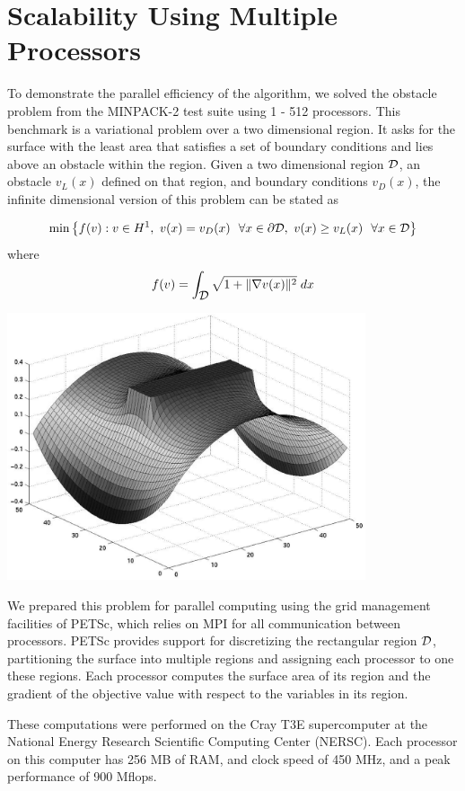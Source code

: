 \section{Scalability Using Multiple Processors}

To demonstrate the parallel efficiency of the algorithm,
we solved the obstacle problem from the MINPACK-2 test
suite using 1 - 512 processors.  
This benchmark is a variational problem over a two
dimensional region.  
It asks for the surface with the least area that satisfies a 
set of boundary conditions and lies above an obstacle within
the region. 
Given a two dimensional region ${\mbox{$\cal D$}}$, an obstacle $v_L(x)$ defined on
that region, and boundary conditions $v_D (x)$,
the infinite dimensional version of this problem can be stated as

\[
\min \left \{ f(v) :
v \in H^1, \ v(x) = v_D (x) \ \ \forall  x \in \partial \cD, \ 
                v(x) \ge v_L (x) \ \ \forall  x \in \cD
\right \}
\]
where 
\[
f(v) = \int_{\mbox{$\cal D$}} \sqrt{ 1 + \| \nabla v(x) \|^2 } \; dx
\]

\centerline {\includegraphics[height=3.1in]{surf5.ps}}

We prepared this problem for parallel computing 
using the grid management facilities of PETSc, 
which relies on MPI \cite{using-mpi} for all
communication between processors.
PETSc provides support for
discretizing the rectangular region ${\mbox{$\cal D$}}$,
partitioning the surface into multiple regions and assigning
each processor to one these regions.  Each processor computes the surface
area of its region and the gradient of the objective value with respect to
the variables in its region.

These computations were performed on the Cray T3E supercomputer at the 
National Energy Research Scientific Computing Center (NERSC).
Each processor on this computer has 256 MB of RAM, and clock speed 
of 450 MHz, and a peak performance of  900 Mflops.  


